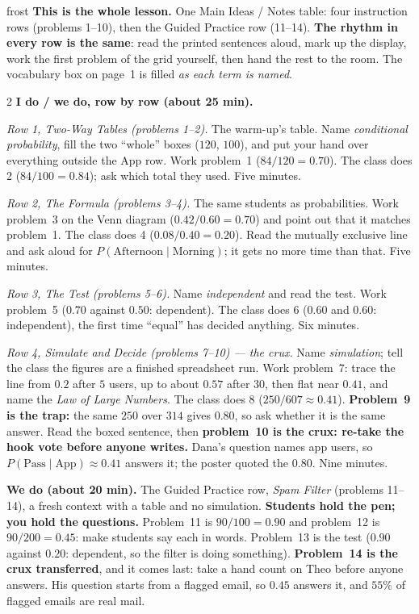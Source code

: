 \documentclass[10pt]{article}
\begin{document}
\boxguard
\begin{skillbox}{frost}
\textbf{This is the whole lesson.} One Main Ideas / Notes table: four instruction rows (problems
1--10), then the Guided Practice row (11--14). \textbf{The rhythm in every row is the same}: read
the printed sentences aloud, mark up the display, work the first problem of the grid yourself, then
hand the rest to the room. The vocabulary box on page~1 is filled \emph{as each term is named}.
\begin{multicols}{2}
\textbf{I do / we do, row by row (about 25 min).}

\emph{Row 1, Two-Way Tables (problems 1--2).} The warm-up's table. Name \emph{conditional
probability}, fill the two ``whole'' boxes ($120$, $100$), and put your hand over everything outside
the App row. Work problem~1 ($84/120 = 0.70$). The class does 2 ($84/100 = 0.84$); ask which total
they used. Five minutes.

\emph{Row 2, The Formula (problems 3--4).} The same students as probabilities. Work problem~3 on
the Venn diagram ($0.42/0.60 = 0.70$) and point out that it matches problem~1. The class does 4
($0.08/0.40 = 0.20$). Read the mutually exclusive line and ask aloud for
$P(\text{Afternoon} \mid \text{Morning})$; it gets no more time than that. Five minutes.

\emph{Row 3, The Test (problems 5--6).} Name \emph{independent} and read the test. Work problem~5
($0.70$ against $0.50$: dependent). The class does 6 ($0.60$ and $0.60$: independent), the first
time ``equal'' has decided anything. Six minutes.

\emph{Row 4, Simulate and Decide (problems 7--10) --- the crux.} Name \emph{simulation}; tell the
class the figures are a finished spreadsheet run. Work problem~7: trace the line from $0.2$ after
$5$ users, up to about $0.57$ after $30$, then flat near $0.41$, and name the \emph{Law of Large
Numbers}. The class does 8 ($250/607 \approx 0.41$). \textbf{Problem~9 is the trap:} the same $250$
over $314$ gives $0.80$, so ask whether it is the same answer. Read the boxed sentence, then
\textbf{problem~10 is the crux: re-take the hook vote before anyone writes.} Dana's question names
app users, so $P(\text{Pass} \mid \text{App}) \approx 0.41$ answers it; the poster quoted the $0.80$.
Nine minutes.

\columnbreak
\textbf{We do (about 20 min).} The Guided Practice row, \emph{Spam Filter} (problems 11--14), a fresh
context with a table and no simulation. \textbf{Students hold the pen; you hold the questions.}
Problem~11 is $90/100 = 0.90$ and problem~12 is $90/200 = 0.45$: make students say each in words.
Problem~13 is the test ($0.90$ against $0.20$: dependent, so the filter is doing something).
\textbf{Problem~14 is the crux transferred}, and it comes last: take a hand count on Theo before
anyone answers. His question starts from a flagged email, so $0.45$ answers it, and $55\%$ of
flagged emails are real mail.


\end{multicols}
\end{skillbox}
\end{document}

